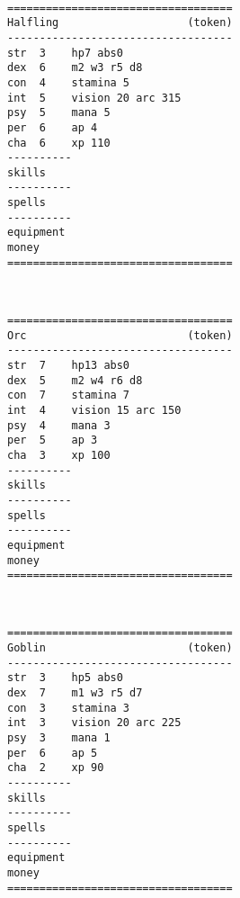 \

\goodbreak \tiny \begin{samepage} \begin{verbatim}
===================================
Halfling                    (token)
-----------------------------------
str  3    hp7 abs0
dex  6    m2 w3 r5 d8
con  4    stamina 5
int  5    vision 20 arc 315
psy  5    mana 5
per  6    ap 4
cha  6    xp 110
----------
skills
----------
spells
----------
equipment
money
===================================
\end{verbatim} \end{samepage} \normalsize

\


\goodbreak \tiny \begin{samepage} \begin{verbatim}
===================================
Orc                         (token)
-----------------------------------
str  7    hp13 abs0
dex  5    m2 w4 r6 d8
con  7    stamina 7
int  4    vision 15 arc 150
psy  4    mana 3
per  5    ap 3
cha  3    xp 100
----------
skills
----------
spells
----------
equipment
money
===================================
\end{verbatim} \end{samepage} \normalsize

\

\goodbreak \tiny \begin{samepage} \begin{verbatim}
===================================
Goblin                      (token)
-----------------------------------
str  3    hp5 abs0
dex  7    m1 w3 r5 d7
con  3    stamina 3
int  3    vision 20 arc 225
psy  3    mana 1
per  6    ap 5
cha  2    xp 90
----------
skills
----------
spells
----------
equipment
money
===================================
\end{verbatim} \end{samepage} \normalsize

\

